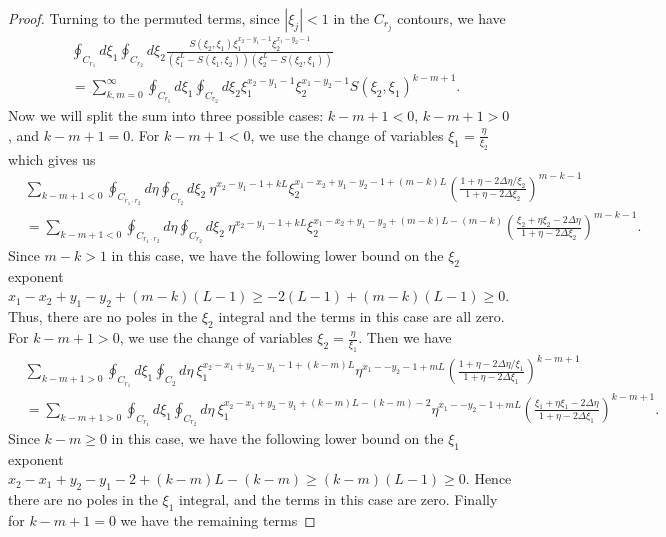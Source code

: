 \documentclass[10pt,a4paper]{amsart}
\begin{document}
\begin{proof}
Turning to the permuted terms, since $|\xi_j|< 1$ in the $C_{r_j}$ contours, we have
\begin{equation}\begin{split}
&\oint_{C_{r_1}}d\xi_1\oint_{C_{r_2}}d\xi_2 \frac{S(\xi_2,\xi_1)\xi_1^{x_2-y_1-1}\xi_2^{x_1-y_2-1}}{\left(\xi_1^L - S(\xi_1,\xi_2) \right)\left(\xi_2^L - S(\xi_2,\xi_1) \right)}\\
&=\sum_{k,m=0}^\infty \oint_{C_{r_1}}d\xi_1\oint_{C_{r_2}}d\xi_2 \xi_1^{x_2-y_1-1}\xi_2^{x_1-y_2-1}S(\xi_2,\xi_1)^{k-m+1}.
\end{split}
\end{equation}
Now we will split the sum into three possible cases: $k-m+1<0$, $k-m+1>0$, and $k-m+1=0$. For $k-m+1<0$, we use the change of variables $\xi_1=\frac{\eta}{\xi_2}$ which gives us
\begin{equation}
    \begin{split}
        &\sum_{k-m+1<0}\oint_{C_{r_1\cdot r_2}}d\eta\oint_{C_{r_2}}d\xi_2 \ \eta^{x_2-y_1-1+kL}\xi_2^{x_1-x_2+y_1-y_2-1+(m-k)L}\left(\frac{1+\eta-2\Delta\eta/\xi_2}{1+\eta-2\Delta\xi_2} \right)^{m-k-1} \\
        &= \sum_{k-m+1<0}\oint_{C_{r_1\cdot r_2}}d\eta\oint_{C_{r_2}}d\xi_2 \ \eta^{x_2-y_1-1+kL}\xi_2^{x_1-x_2+y_1-y_2+(m-k)L-(m-k)}\left(\frac{\xi_2+\eta\xi_2-2\Delta\eta}{1+\eta-2\Delta\xi_2} \right)^{m-k-1}.
    \end{split}
\end{equation}
Since $m-k>1$ in this case, we have the following lower bound on the $\xi_2$ exponent $x_1-x_2+y_1-y_2+(m-k)(L-1)\geq -2(L-1)+(m-k)(L-1)\geq 0$. Thus, there are no poles in the $\xi_2$ integral and the terms in this case are all zero. For $k-m+1>0$, we use the change of variables $\xi_2=\frac{\eta}{\xi_1}$. Then we have 
\begin{equation}
    \begin{split}
        &\sum_{k-m+1>0}\oint_{C_{r_1}}d\xi_1\oint_{C_2}d\eta \ \xi_1^{x_2-x_1+y_2-y_1-1+(k-m)L}\eta^{x_1--y_2-1+mL}\left(\frac{1+\eta-2\Delta\eta/\xi_1}{1+\eta-2\Delta\xi_1} \right)^{k-m+1} \\
        &=\sum_{k-m+1>0}\oint_{C_{r_1}}d\xi_1\oint_{C_{r_2}}d\eta \ \xi_1^{x_2-x_1+y_2-y_1+(k-m)L-(k-m)-2}\eta^{x_1--y_2-1+mL}\left(\frac{\xi_1+\eta\xi_1-2\Delta\eta}{1+\eta-2\Delta\xi_1} \right)^{k-m+1}.
        \end{split}
\end{equation}
Since $k-m\geq0$ in this case, we have the following lower bound on the $\xi_1$ exponent $x_2-x_1+y_2-y_1-2+(k-m)L-(k-m)\geq (k-m)(L-1) \geq 0$. Hence there are no poles in the $\xi_1$ integral, and the terms in this case are zero. Finally for $k-m+1 = 0$ we have the remaining terms

\end{proof}
\end{document}
